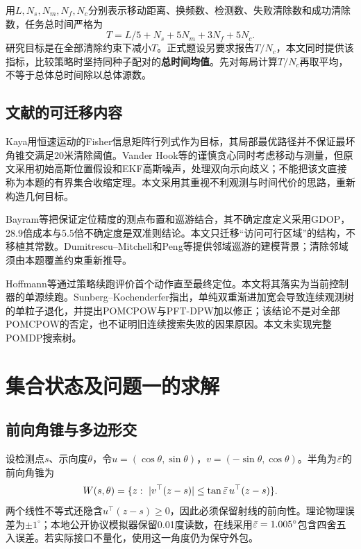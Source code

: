 \documentclass[UTF8,a4paper,zihao=-4,fontset=mac]{ctexart}
\begin{document}
用$L,N_s,N_m,N_f,N_c$分别表示移动距离、换频数、检测数、失败清除数和成功清除数，任务总时间严格为
\begin{equation}\label{eq:time}T=L/5+N_s+5N_m+3N_f+5N_c.\end{equation}
研究目标是在全部清除约束下减小$T$。正式题设另要求报告$T/N_c$，本文同时提供该指标，比较策略时坚持同种子配对的\textbf{总时间均值}。先对每局计算$T/N_c$再取平均，不等于总体总时间除以总体源数。

\subsection{文献的可迁移内容}
Kaya\cite{kaya}用恒速运动的Fisher信息矩阵行列式作为目标，其局部最优路径并不保证最坏角锥交满足20米清除阈值。Vander Hook等\cite{hook}的谨慎贪心同时考虑移动与测量，但原文采用初始高斯位置假设和EKF高斯噪声，处理双向示向歧义；不能把该文直接称为本题的有界集合收缩定理。本文采用其重视不利观测与时间代价的思路，重新构造几何目标。

Bayram等\cite{bayram}把保证定位精度的测点布置和巡游结合，其不确定度定义采用GDOP，28.9倍成本与5.5倍不确定度是双准则结论。本文只迁移“访问可行区域”的结构，不移植其常数。Dumitrescu--Mitchell\cite{dumitrescu}和Peng等\cite{peng}提供邻域巡游的建模背景；清除邻域须由本题覆盖约束重新推导。

Hoffmann等\cite{rollout}通过策略续跑评价首个动作直至最终定位。本文将其落实为当前控制器的单源续跑。Sunberg--Kochenderfer\cite{pomcpow}指出，单纯双重渐进加宽会导致连续观测树的单粒子退化，并提出POMCPOW与PFT-DPW加以修正；该结论不是对全部POMCPOW的否定，也不证明旧连续搜索失败的因果原因。本文未实现完整POMDP搜索树。

\section{集合状态及问题一的求解}
\subsection{前向角锥与多边形交}
设检测点$s$、示向度$\theta$，令$u=(\cos\theta,\sin\theta)$，$v=(-\sin\theta,\cos\theta)$。半角为$\bar\varepsilon$的前向角锥为
\begin{equation}
 W(s,\theta)=\{z:\ |v^\top(z-s)|\le \tan\bar\varepsilon\,u^\top(z-s)\}.
\end{equation}
两个线性不等式还隐含$u^\top(z-s)\ge0$，因此必须保留射线的前向性。理论物理误差为$\pm1^\circ$；本地公开协议模拟器保留0.01度读数，在线采用$\bar\varepsilon=1.005^\circ$包含四舍五入误差。若实际接口不量化，使用这一角度仍为保守外包。
\end{document}
